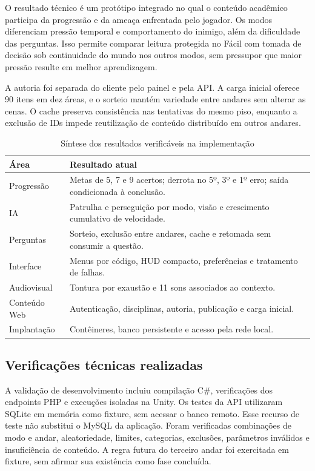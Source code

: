 \documentclass[12pt]{article}
\begin{document}
O resultado técnico é um protótipo integrado no qual o conteúdo acadêmico participa da progressão e da ameaça enfrentada pelo jogador. Os modos diferenciam pressão temporal e comportamento do inimigo, além da dificuldade das perguntas. Isso permite comparar leitura protegida no Fácil com tomada de decisão sob continuidade do mundo nos outros modos, sem pressupor que maior pressão resulte em melhor aprendizagem.

A autoria foi separada do cliente pelo painel e pela API. A carga inicial oferece 90 itens em dez áreas, e o sorteio mantém variedade entre andares sem alterar as cenas. O cache preserva consistência nas tentativas do mesmo piso, enquanto a exclusão de IDs impede reutilização de conteúdo distribuído em outros andares.

\begin{table}[H]
\centering
\caption{Síntese dos resultados verificáveis na implementação}
\label{tab:resultados-implementados}
\small
\begin{tabularx}{\textwidth}{p{3cm}X}
\toprule
\textbf{Área} & \textbf{Resultado atual} \\
\midrule
Progressão & Metas de 5, 7 e 9 acertos; derrota no 5º, 3º e 1º erro; saída condicionada à conclusão. \\
IA & Patrulha e perseguição por modo, visão e crescimento cumulativo de velocidade. \\
Perguntas & Sorteio, exclusão entre andares, cache e retomada sem consumir a questão. \\
Interface & Menus por código, HUD compacto, preferências e tratamento de falhas. \\
Audiovisual & Tontura por exaustão e 11 sons associados ao contexto. \\
Conteúdo Web & Autenticação, disciplinas, autoria, publicação e carga inicial. \\
Implantação & Contêineres, banco persistente e acesso pela rede local. \\
\bottomrule
\end{tabularx}
\end{table}

\subsection{Verificações técnicas realizadas}

A validação de desenvolvimento incluiu compilação C\#, verificações dos endpoints PHP e execuções isoladas na Unity. Os testes da API utilizaram SQLite em memória como fixture, sem acessar o banco remoto. Esse recurso de teste não substitui o MySQL da aplicação. Foram verificadas combinações de modo e andar, aleatoriedade, limites, categorias, exclusões, parâmetros inválidos e insuficiência de conteúdo. A regra futura do terceiro andar foi exercitada em fixture, sem afirmar sua existência como fase concluída.
\end{document}
